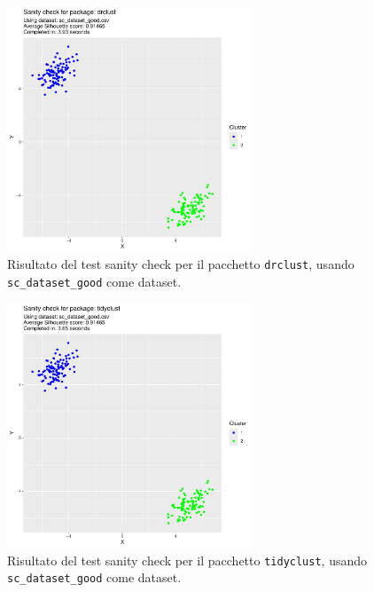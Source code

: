 \documentclass[a4paper, 12pt]{report}
\begin{document}
			\begin{figure}[H]
				\centering
				\includegraphics[width = 0.65\textwidth, page = 1]{results/results_DRCLUST.pdf}
				\caption{Risultato del test sanity check per il pacchetto \texttt{drclust}, usando \texttt{sc\_dataset\_good} come dataset.}
				\label{fig:drclustgood}
			\end{figure}

			\begin{figure}[H]
				\centering
				\includegraphics[width = 0.65\textwidth, page = 1]{results/results_TIDYCLUST.pdf}
				\caption{Risultato del test sanity check per il pacchetto \texttt{tidyclust}, usando \texttt{sc\_dataset\_good} come dataset.}
				\label{fig:tidyclustgood}
			\end{figure}
\end{document}
